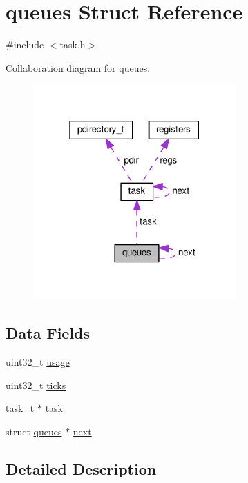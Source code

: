 \hypertarget{structqueues}{}\section{queues Struct Reference}
\label{structqueues}


{\ttfamily \#include $<$task.\+h$>$}



Collaboration diagram for queues\+:
\nopagebreak
\begin{figure}[H]
\begin{center}
\leavevmode
\includegraphics[width=220pt]{structqueues__coll__graph}
\end{center}
\end{figure}
\subsection*{Data Fields}
\begin{DoxyCompactItemize}
\item 
uint32\+\_\+t \hyperlink{structqueues_abcded8e97b078ab04228a84686c301a6}{usage}
\item 
uint32\+\_\+t \hyperlink{structqueues_ab951f1f175f248912a793fc7dac10e5d}{ticks}
\item 
\hyperlink{task_8h_a8aeef2cdb643462b97cd459a8e68cad3}{task\+\_\+t} $\ast$ \hyperlink{structqueues_ad14ef75e56140d0ae658ea2d38d5bb26}{task}
\item 
struct \hyperlink{structqueues}{queues} $\ast$ \hyperlink{structqueues_a9138274fd7864a17d10f7700c2e603d2}{next}
\end{DoxyCompactItemize}


\subsection{Detailed Description}


